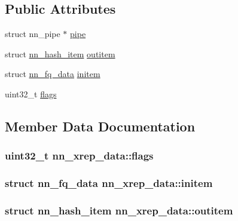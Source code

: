 \subsection*{Public Attributes}
\begin{DoxyCompactItemize}
\item 
struct nn\+\_\+pipe $\ast$ \hyperlink{structnn__xrep__data_ab3cd33d77a367f2527da944c9aaeb577}{pipe}
\item 
struct \hyperlink{structnn__hash__item}{nn\+\_\+hash\+\_\+item} \hyperlink{structnn__xrep__data_acd2caae810b15ecd775ff98bdc42ac71}{outitem}
\item 
struct \hyperlink{structnn__fq__data}{nn\+\_\+fq\+\_\+data} \hyperlink{structnn__xrep__data_ac7d291eec9ff5b59fdaed85298285c53}{initem}
\item 
uint32\+\_\+t \hyperlink{structnn__xrep__data_afa859ffc8eb42330e4e5fbd4b2ea7049}{flags}
\end{DoxyCompactItemize}


\subsection{Member Data Documentation}
\subsubsection[{flags}]{\setlength{\rightskip}{0pt plus 5cm}uint32\+\_\+t nn\+\_\+xrep\+\_\+data\+::flags}\hypertarget{structnn__xrep__data_afa859ffc8eb42330e4e5fbd4b2ea7049}{}\label{structnn__xrep__data_afa859ffc8eb42330e4e5fbd4b2ea7049}
\subsubsection[{initem}]{\setlength{\rightskip}{0pt plus 5cm}struct {\bf nn\+\_\+fq\+\_\+data} nn\+\_\+xrep\+\_\+data\+::initem}\hypertarget{structnn__xrep__data_ac7d291eec9ff5b59fdaed85298285c53}{}\label{structnn__xrep__data_ac7d291eec9ff5b59fdaed85298285c53}
\subsubsection[{outitem}]{\setlength{\rightskip}{0pt plus 5cm}struct {\bf nn\+\_\+hash\+\_\+item} nn\+\_\+xrep\+\_\+data\+::outitem}\hypertarget{structnn__xrep__data_acd2caae810b15ecd775ff98bdc42ac71}{}\label{structnn__xrep__data_acd2caae810b15ecd775ff98bdc42ac71}
